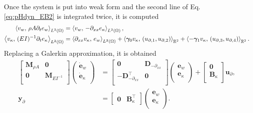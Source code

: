 Once the system is put into weak form and the second line of Eq. \eqref{eq:pHdyn_EB2} is integrated twice, it is  computed 
\begin{equation}
\begin{aligned}
\inner[L^2(\Omega)]{v_w}{\rho A \partial_t e_w} &= \inner[L^2(\Omega)]{v_w}{-\partial_{xx} e_\kappa} , \\
\inner[L^2(\Omega)]{v_\kappa}{(EI)^{-1} \partial_t e_\kappa} &= \inner[L^2(\Omega)]{\partial_{xx} v_\kappa}{ e_w}  + \inner[\mathbb{R}^2]{\bm\gamma_0 v_\kappa}{({u}_{\partial, 1}, {u}_{\partial, 2})} + \inner[\mathbb{R}^2]{-\bm\gamma_1 v_\kappa}{({u}_{\partial, 3}, {u}_{\partial, 4})}. \\
\end{aligned}
\end{equation}
Replacing a Galerkin approximation, it is obtained
\begin{equation}
\begin{aligned}
\begin{bmatrix}
\mathbf{M}_{\rho A} & \mathbf{0} \\
\mathbf{0} & \mathbf{M}_{EI^{-1}} \\
\end{bmatrix}
\begin{pmatrix}
\dot{\mathbf{e}}_{w} \\
\dot{\mathbf{e}}_{\kappa} \\
\end{pmatrix}
&= \begin{bmatrix}
\mathbf{0} & \mathbf{D}_{-\partial_{xx}} \\
-\mathbf{D}_{-\partial_{xx}}^\top & \mathbf{0} \\
\end{bmatrix} 
\begin{pmatrix}
\mathbf{e}_{w} \\
\mathbf{e}_{\kappa} \\
\end{pmatrix} + 
\begin{bmatrix}
\mathbf{0}\\
\mathbf{B}_\kappa\\
\end{bmatrix}
\mathbf{u}_\partial, \\
{\mathbf{y}_\partial} &= \begin{bmatrix}
\mathbf{0} & \mathbf{B}_\kappa^\top 
\end{bmatrix}\begin{pmatrix}
\mathbf{e}_{w} \\
\mathbf{e}_{\kappa} \\
\end{pmatrix}.
\end{aligned}
\end{equation}
